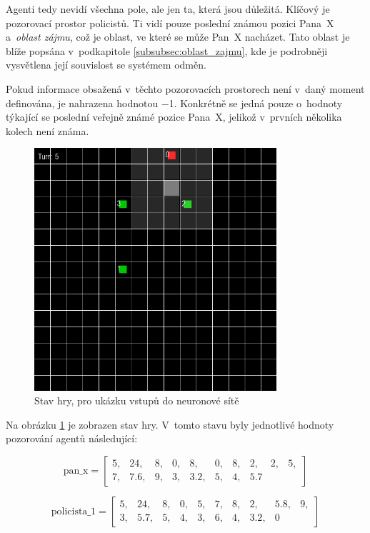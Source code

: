 Agenti tedy nevidí všechna pole, ale jen ta, která jsou důležitá.
Klíčový je pozorovací prostor policistů.
Ti vidí pouze poslední známou pozici Pana~X a~\emph{oblast zájmu}, což je oblast, ve které se může Pan~X nacházet.
Tato oblast je blíže popsána v~podkapitole  \ref{subsubsec:oblast_zajmu}, kde je podrobněji vysvětlena její souvislost se systémem odměn.

Pokud informace obsažená v~těchto pozorovacích prostorech není v~daný moment definována, je nahrazena hodnotou $\minus$1.
Konkrétně se jedná pouze o~hodnoty týkající se poslední veřejně známé pozice Pana~X, jelikož v~prvních několika kolech není známa.

\begin{figure}[H]
	\centering
	\includegraphics[width=0.8\textwidth]{obrazky-figures/game_inputs}
      \caption{Stav hry, pro ukázku vstupů do neuronové sítě}
    \label{fig:game_input}
\end{figure}
Na obrázku \ref{fig:game_input} je zobrazen stav hry.
V~tomto stavu byly jednotlivé hodnoty pozorování agentů následující:

\[
\text{pan\_x} = \begin{bmatrix}
5, & 24, & 8, & 0, & 8, & 0, & 8, & 2, & 2, & 5, \\
7, & 7.6, & 9, & 3, & 3.2, & 5, & 4, & 5.7
\end{bmatrix}
\]

\[
\text{policista\_1} = \begin{bmatrix}
5, & 24, & 8, & 0, & 5, & 7, & 8, & 2, & 5.8, & 9, \\
3, & 5.7, & 5, & 4, & 3, & 6, & 4, & 3.2, & 0
\end{bmatrix}
\]

